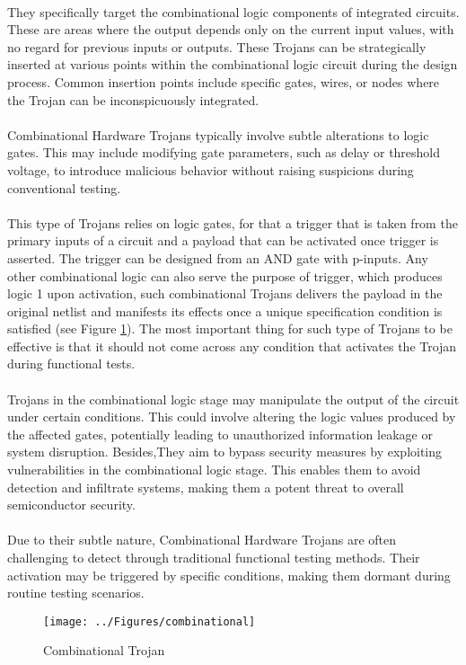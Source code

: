 \paragraph*{}
They specifically target the combinational logic components of integrated circuits. These are areas where the output depends only on the current input values, with no regard for previous inputs or outputs. These Trojans can be strategically inserted at various points within the combinational logic circuit during the design process. Common insertion points include specific gates, wires, or nodes where the Trojan can be inconspicuously integrated.
\paragraph*{}
Combinational Hardware Trojans typically involve subtle alterations to logic gates. This may include modifying gate parameters, such as delay or threshold voltage, to introduce malicious behavior without raising suspicions during conventional testing.
\paragraph*{}
This type of Trojans relies on logic gates, for that a trigger that is taken from the primary inputs of a circuit and a payload that can be activated once trigger is asserted. The trigger can be designed from an AND gate with p-inputs. Any other combinational logic can also serve the purpose of trigger, which produces logic 1 upon activation, such combinational Trojans delivers the payload in the original netlist and manifests its effects once a unique specification condition is satisfied (see Figure \ref{fig:combinational}). The most important thing for such type of Trojans to be effective is that it should not come across any condition that activates the Trojan during functional tests.
\paragraph*{}
Trojans in the combinational logic stage may manipulate the output of the circuit under certain conditions. This could involve altering the logic values produced by the affected gates, potentially leading to unauthorized information leakage or system disruption. Besides,They aim to bypass security measures by exploiting vulnerabilities in the combinational logic stage. This enables them to avoid detection and infiltrate systems, making them a potent threat to overall semiconductor security.
\paragraph*{}
Due to their subtle nature, Combinational Hardware Trojans are often challenging to detect through traditional functional testing methods. Their activation may be triggered by specific conditions, making them dormant during routine testing scenarios.
\begin{figure}[h]
	\centering
	\texttt{[image: ../Figures/combinational]}
	\caption{Combinational Trojan}
	\label{fig:combinational}
\end{figure}

